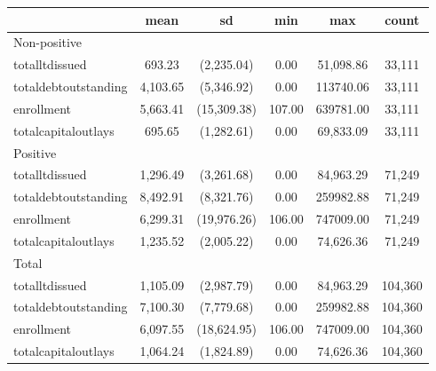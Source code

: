 
\begin{tabular}{l*{1}{ccccc}}
\toprule
                    &        mean&          sd&         min&         max&       count\\
\midrule
Non-positive        &            &            &            &            &            \\
totalltdissued      &      693.23&  (2,235.04)&        0.00&   51,098.86&      33,111\\
totaldebtoutstanding&    4,103.65&  (5,346.92)&        0.00&   113740.06&      33,111\\
enrollment          &    5,663.41& (15,309.38)&      107.00&   639781.00&      33,111\\
totalcapitaloutlays &      695.65&  (1,282.61)&        0.00&   69,833.09&      33,111\\
\midrule
Positive            &            &            &            &            &            \\
totalltdissued      &    1,296.49&  (3,261.68)&        0.00&   84,963.29&      71,249\\
totaldebtoutstanding&    8,492.91&  (8,321.76)&        0.00&   259982.88&      71,249\\
enrollment          &    6,299.31& (19,976.26)&      106.00&   747009.00&      71,249\\
totalcapitaloutlays &    1,235.52&  (2,005.22)&        0.00&   74,626.36&      71,249\\
\midrule
Total               &            &            &            &            &            \\
totalltdissued      &    1,105.09&  (2,987.79)&        0.00&   84,963.29&     104,360\\
totaldebtoutstanding&    7,100.30&  (7,779.68)&        0.00&   259982.88&     104,360\\
enrollment          &    6,097.55& (18,624.95)&      106.00&   747009.00&     104,360\\
totalcapitaloutlays &    1,064.24&  (1,824.89)&        0.00&   74,626.36&     104,360\\
\bottomrule
\end{tabular}
